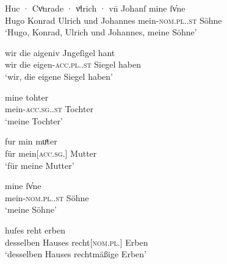 \begin{exe}
\ex \label{ex:adjkonstregel}
	\begin{xlist}
	\ex \label{ex:adjkonstregel_1}
		\gll Huc · Cvͦnrade · vͦlrich · vn̄ Johanſ mine ſv̓ne \\
			Hugo {} Konrad {} Ulrich {} und Johannes
				mein-\textsc{nom.pl.\MascM.st} Söhne \\
		\trans `Hugo, Konrad, Ulrich und Johannes, meine Söhne'
			\parencites(Nr.~2654, Konstanz, 1297)[57,33]{cao4}

	\ex \label{ex:adjkonstregel_2}
		\gll wir die aigeniv Jngeſigel hant \\
			wir die eigen-\textsc{acc.pl.\NeutI.st} Siegel haben \\
		\trans `wir, die eigene Siegel haben'
			\parencites(Nrn.~530~AB, Konstanz, 1282)[468,3--4]{cao1}
	\end{xlist}

\ex \label{ex:adjkonstesg}
	\begin{xlist}
	\ex \label{ex:adjkonstesg_1}
		\gll mine tohter \\
			mein-\textsc{acc.sg.\FemF.st} Tochter \\
		\trans `meine Tochter'
			\parencites(Nr.~2226, Überlingen, Bodenseekr., 1295)[373,42]{cao3}

	\ex \label{ex:adjkonstesg_2}
		\gll fur min muͦter \\
			für mein[\textsc{acc.sg.\FemF}] Mutter \\
		\trans `für meine Mutter'
			\parencites(Nr.~530~B, Konstanz, 1282)[464,12]{cao1}
	\end{xlist}
\end{exe}

\begin{exe}
\ex \label{ex:adjkonstepl}
	\begin{xlist}
	\ex \label{ex:adjkonstepl_1}
		\gll mine ſv̓ne \\
			mein-\textsc{nom.pl.\MascM.st} Söhne \\
		\trans `meine Söhne'
			\parencites(Nr.~2654, Konstanz, 1297)[57,44]{cao4}

	\ex \label{ex:adjkonstepl_2}
		 huſes reht erben \\
			desselben Hauses recht[\textsc{nom.pl.\MascA}] Erben \\
		\trans `desselben Hauses rechtmäßige Erben'
			\parencites(Nr.~2675, Konstanz, 1297)[71,34]{cao4}
	\end{xlist}
\end{exe}

